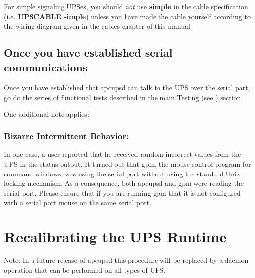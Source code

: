 {{{{{{{{{{For simple signaling UPSes, you should {\it not} use {\bf simple} in the cable
specification (i.e. {\bf UPSCABLE simple}) unless you have made the cable
yourself according to the wiring diagram given in the cables chapter of this
manual. 

\label{Once-you-have-established-serial-communications}

\subsection*{Once you have established serial communications}

\label{index-Testing-230}
Once you have established that apcupsd can talk to the UPS over the serial
part, go do the series of functional tests described in the main Testing (see 
) section.  

One additional note applies: 

\label{Bizarre-Intermittent-Behavior}

\subsubsection*{Bizarre Intermittent Behavior:}

In one case, a user reported that he received random incorrect values from the
UPS in the status output. It turned out that gpm, the mouse control program
for command windows, was using the serial port without using the standard Unix
locking mechanism. As a consequence, both apcupsd and gpm were reading the
serial port. Please ensure that if you are running gpm that it is not
configured with a serial port mouse on the same serial port. 

\label{Recalibrating-the-UPS-Runtime}

\section*{Recalibrating the UPS Runtime}

\label{index-Runtime-recalibration-231}
\label{index-Recalibration-Runtime-232}
Note: In a future release of apcupsd this procedure will be replaced by a
daemon operation that can be performed on all types of UPS.  

}}}}}}}}}}
